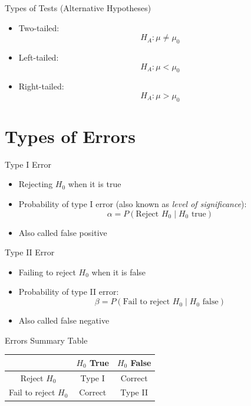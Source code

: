 \documentclass[12pt, aspectratio=169]{beamer}
\begin{document}
    \begin{frame}{Types of Tests (Alternative Hypotheses)}
        \begin{itemize}
            \item Two-tailed:
            \[
            H_A: \mu \neq \mu_0
            \]
            \item Left-tailed:
            \[
            H_A: \mu < \mu_0
            \]
            \item Right-tailed:
            \[
            H_A: \mu > \mu_0
            \]
        \end{itemize}
    \end{frame}


    \section{Types of Errors}


    \begin{frame}{Type I Error}
        \begin{itemize}
            \item Rejecting $H_0$ when it is true
            \item Probability of type I error (also known as \emph{level of significance}):
            \[
            \alpha = P(\text{Reject } H_0 \mid H_0 \text{ true})
            \]
            \item Also called false positive
        \end{itemize}
    \end{frame}


    \begin{frame}{Type II Error}
        \begin{itemize}
            \item Failing to reject $H_0$ when it is false
            \item Probability of type II error:
            \[
            \beta = P(\text{Fail to reject } H_0 \mid H_0 \text{ false})
            \]
            \item Also called false negative
        \end{itemize}
    \end{frame}


    \begin{frame}{Errors Summary Table}
        \begin{center}
            \begin{tabular}{c|cc}
                \hline
                & $H_0$ True & $H_0$ False \\
                \hline
                Reject $H_0$ & Type I & Correct \\
                Fail to reject $H_0$ & Correct & Type II \\
                \hline
            \end{tabular}
        \end{center}
    \end{frame}
\end{document}
